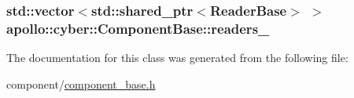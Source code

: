 \hypertarget{classapollo_1_1cyber_1_1ComponentBase_a381445ac2102bd1a34dbf87fef480919}{
\subsubsection[{readers\-\_\-}]{\setlength{\rightskip}{0pt plus 5cm}std\-::vector$<$std\-::shared\-\_\-ptr$<${\bf Reader\-Base}$>$ $>$ apollo\-::cyber\-::\-Component\-Base\-::readers\-\_\-\hspace{0.3cm}{\ttfamily [protected]}}}\label{classapollo_1_1cyber_1_1ComponentBase_a381445ac2102bd1a34dbf87fef480919}


The documentation for this class was generated from the following file\-:\begin{DoxyCompactItemize}
\item 
component/\hyperlink{component__base_8h}{component\-\_\-base.\-h}\end{DoxyCompactItemize}
